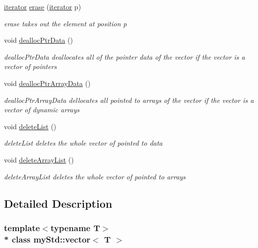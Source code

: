 \begin{DoxyCompactItemize}
\hyperlink{classmyStd_1_1vector_a667a65b093f1253d2229d06768aa3bf9}{iterator} \hyperlink{classmyStd_1_1vector_aa4ecb71647140e3c5226299f84828984}{erase} (\hyperlink{classmyStd_1_1vector_a667a65b093f1253d2229d06768aa3bf9}{iterator} p)
\begin{DoxyCompactList}\small\item\em erase takes out the element at position p \end{DoxyCompactList}\item 
void \hyperlink{classmyStd_1_1vector_a67598296046328471d19ce1fc5be796f}{dealloc\+Ptr\+Data} ()
\begin{DoxyCompactList}\small\item\em dealloc\+Ptr\+Data deallocates all of the pointer data of the vector if the vector is a vector of pointers \end{DoxyCompactList}\item 
void \hyperlink{classmyStd_1_1vector_ab67c727d73d08372770562b4e4ae7a05}{dealloc\+Ptr\+Array\+Data} ()
\begin{DoxyCompactList}\small\item\em dealloc\+Ptr\+Array\+Data dellocates all pointed to arrays of the vector if the vector is a vector of dynamic arrays \end{DoxyCompactList}\item 
void \hyperlink{classmyStd_1_1vector_a794565e7ec67e8d2b90fe2247612a778}{delete\+List} ()
\begin{DoxyCompactList}\small\item\em delete\+List deletes the whole vector of pointed to data \end{DoxyCompactList}\item 
void \hyperlink{classmyStd_1_1vector_a6a0db76b04cb2c2bf8b7aa9d2a6f36c4}{delete\+Array\+List} ()
\begin{DoxyCompactList}\small\item\em delete\+Array\+List deletes the whole vector of pointed to arrays \end{DoxyCompactList}\end{DoxyCompactItemize}


\subsection{Detailed Description}
\subsubsection*{template$<$typename T$>$\\*
class my\+Std\+::vector$<$ T $>$}


